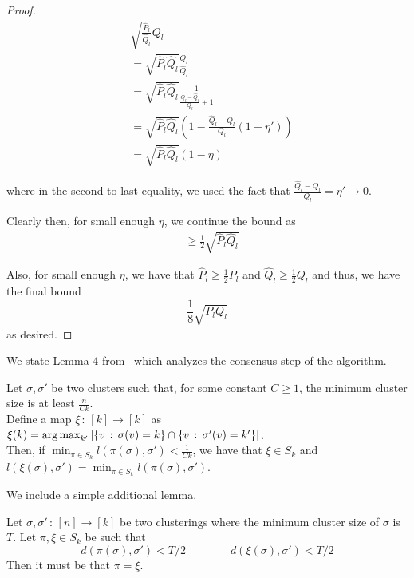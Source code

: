 \begin{proof}

\begin{align*}
& \sqrt{\frac{\hat{P}_l}{\hat{Q}_l} } Q_l \\
&= \sqrt{ \hat{P}_l \hat{Q}_l} \frac{Q_l}{\hat{Q}_l} \\
&= \sqrt{\hat{P}_l \hat{Q}_l} \frac{1}{ \frac{Q_l - \hat{Q}_l}{Q_l} + 1 } \\
&= \sqrt{\hat{P}_l \hat{Q}_l} 
  \left( 1 - \frac{\hat{Q}_l - Q_l}{Q_l} (1 + \eta') \right)  \\
&= \sqrt{\hat{P}_l \hat{Q}_l} (1 - \eta)
\end{align*}

where in the second to last equality, we used the fact that $\frac{\hat{Q}_l - Q_l}{Q_l} = \eta' \rightarrow 0$. 

Clearly then, for small enough $\eta$, we continue the bound as 
\begin{align*}
&\geq \frac{1}{2} \sqrt{ \hat{P}_l \hat{Q}_l} 
\end{align*}

Also, for small enough $\eta$, we have that $\hat{P}_l \geq \frac{1}{2} P_l$ and $\hat{Q}_l \geq \frac{1}{2} Q_l$ and thus, we have the final bound
\[
\frac{1}{8} \sqrt{ P_l Q_l}
\]
as desired. 

\end{proof}






We state Lemma 4 from~\cite{gao2015achieving} which analyzes the consensus step of the algorithm.

\begin{lemma} 
\label{lem:consensus_analysis}
Let $\sigma, \sigma'$ be two clusters such that, for some constant $C \geq 1$, the minimum cluster size is at least $ \frac{n}{Ck}$. \\

Define a map $\xi \,:\, [k] \rightarrow [k]$ as $\xi(k) = \mathop{\text{\rm arg\,max}}_{k'} | \{ v \,:\, \sigma(v) = k \} \cap \{ v \,:\, \sigma'(v) = k' \} |$.\\

Then, if $\min_{\pi \in S_k} l(\pi(\sigma), \sigma') < \frac{1}{Ck}$, we have that $\xi \in S_k$ and $l(\xi(\sigma), \sigma') = \min_{\pi \in S_k} l(\pi(\sigma), \sigma')$. 
\end{lemma}

We include a simple additional lemma.
\begin{lemma}
\label{lem:consensus_uniqueness}
Let $\sigma, \sigma' \,:\, [n] \rightarrow [k]$ be two clusterings where the minimum cluster size of $\sigma$ is $T$. Let $\pi, \xi \in S_k$ be such that
\[
d(\pi(\sigma), \sigma') < T/2 \qquad \qquad d(\xi(\sigma), \sigma') < T/2
\]
Then it must be that $\pi = \xi$.
\end{lemma}

